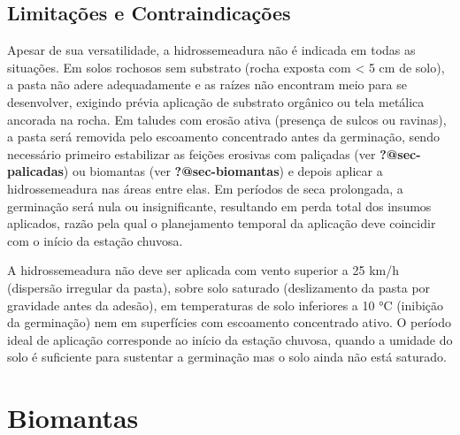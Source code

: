 \documentclass[
  portuguese,
  11pt,
  a4paper,
  open=any]{scrbook}
\begin{document}
\section{Limitações e
Contraindicações}\label{limitauxe7uxf5es-e-contraindicauxe7uxf5es}

Apesar de sua versatilidade, a hidrossemeadura não é indicada em todas
as situações. Em solos rochosos sem substrato (rocha exposta com
\textless{} 5 cm de solo), a pasta não adere adequadamente e as raízes
não encontram meio para se desenvolver, exigindo prévia aplicação de
substrato orgânico ou tela metálica ancorada na rocha. Em taludes com
erosão ativa (presença de sulcos ou ravinas), a pasta será removida pelo
escoamento concentrado antes da germinação, sendo necessário primeiro
estabilizar as feições erosivas com paliçadas (ver
\textbf{?@sec-palicadas}) ou biomantas (ver \textbf{?@sec-biomantas}) e
depois aplicar a hidrossemeadura nas áreas entre elas. Em períodos de
seca prolongada, a germinação será nula ou insignificante, resultando em
perda total dos insumos aplicados, razão pela qual o planejamento
temporal da aplicação deve coincidir com o início da estação chuvosa.

\begin{tcolorbox}[enhanced jigsaw, leftrule=.75mm, colframe=quarto-callout-warning-color-frame, colback=white, bottomrule=.15mm, opacityback=0, colbacktitle=quarto-callout-warning-color!10!white, breakable, bottomtitle=1mm, opacitybacktitle=0.6, title=\textcolor{quarto-callout-warning-color}{\faExclamationTriangle}\hspace{0.5em}{Condições de aplicação}, titlerule=0mm, toprule=.15mm, toptitle=1mm, rightrule=.15mm, left=2mm, arc=.35mm, coltitle=black]

A hidrossemeadura não deve ser aplicada com vento superior a 25 km/h
(dispersão irregular da pasta), sobre solo saturado (deslizamento da
pasta por gravidade antes da adesão), em temperaturas de solo inferiores
a 10 °C (inibição da germinação) nem em superfícies com escoamento
concentrado ativo. O período ideal de aplicação corresponde ao início da
estação chuvosa, quando a umidade do solo é suficiente para sustentar a
germinação mas o solo ainda não está saturado.

\end{tcolorbox}

\chapter{Biomantas}\label{biomantas}
\end{document}
